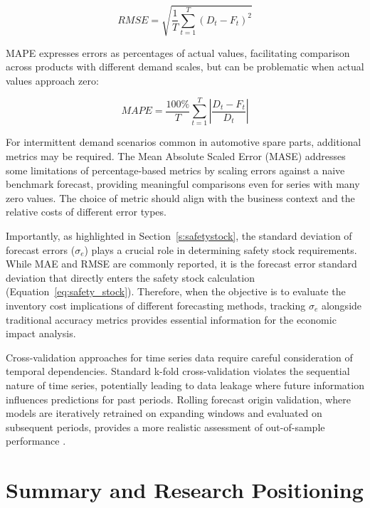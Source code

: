 \documentclass[ENG]{TFUOC}%
\begin{document}
\begin{equation}
    RMSE = \sqrt{\frac{1}{T} \sum_{t=1}^{T} (D_t - F_t)^2}
\end{equation}

MAPE expresses errors as percentages of actual values, facilitating 
comparison across products with different demand scales, but can be 
problematic when actual values approach zero:

\begin{equation}
    MAPE = \frac{100\%}{T} \sum_{t=1}^{T} \left|\frac{D_t - F_t}{D_t}\right|
\end{equation}

For intermittent demand scenarios common in automotive spare parts, 
additional metrics may be required. The Mean Absolute Scaled Error 
(MASE) addresses some limitations of percentage-based metrics by 
scaling errors against a naive benchmark forecast, providing meaningful 
comparisons even for series with many zero values. The choice of metric 
should align with the business context and the relative costs of 
different error types.

Importantly, as highlighted in Section~\ref{s:safetystock}, the 
standard deviation of forecast errors ($\sigma_e$) plays a crucial 
role in determining safety stock requirements. While MAE and RMSE are 
commonly reported, it is the forecast error standard deviation that 
directly enters the safety stock calculation 
(Equation~\ref{eq:safety_stock}). Therefore, when the objective is to 
evaluate the inventory cost implications of different forecasting 
methods, tracking $\sigma_e$ alongside traditional accuracy metrics 
provides essential information for the economic impact analysis.

Cross-validation approaches for time series data require careful 
consideration of temporal dependencies. Standard k-fold 
cross-validation violates the sequential nature of time series, 
potentially leading to data leakage where future information influences 
predictions for past periods. Rolling forecast origin validation, where 
models are iteratively retrained on expanding windows and evaluated on 
subsequent periods, provides a more realistic assessment of 
out-of-sample performance \citep{makridakis2021m5findings}.


\section{Summary and Research Positioning}
\end{document}
